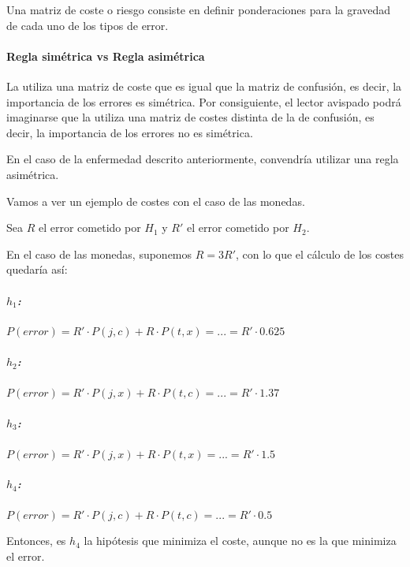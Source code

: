 \documentclass{apuntes}
\begin{document}
\begin{defn}
	Una matriz de coste o riesgo consiste en definir ponderaciones para la gravedad de cada uno de los tipos de error. 
\end{defn}


\paragraph{Regla simétrica vs Regla asimétrica}
 La  utiliza una matriz de coste que es igual que la matriz de confusión, es decir, la importancia de los errores es simétrica.  Por consiguiente, el lector avispado podrá imaginarse que la  utiliza una matriz de costes distinta de la de confusión, es decir, la importancia de los errores no es simétrica.

 En el caso de la enfermedad descrito anteriormente, convendría utilizar una regla asimétrica. 

 \begin{example}
Vamos a ver un ejemplo de costes con el caso de las monedas. 

Sea $R$ el error cometido por $H_1$ y $R'$ el error cometido por $H_2$. 

En el caso de las monedas, suponemos $R = 3R'$, con lo que el cálculo de los costes quedaría así:


\subparagraph{$h_1$:} $P(error) = R' · P(j,c) + R · P(t,x) = ... = R' · 0.625$
\subparagraph{$h_2$:} $P(error) = R' · P(j,x) + R · P(t,c) = ... = R' · 1.37$
\subparagraph{$h_3$:} $P(error) = R' · P(j,x) + R · P(t,x) = ... = R' · 1.5$
\subparagraph{$h_4$:} $P(error) = R' · P(j,c) + R · P(t,c) = ... = R' · 0.5$

Entonces, es $h_4$ la hipótesis que minimiza el coste, aunque no es la que minimiza el error.


 \end{example}
\end{document}
